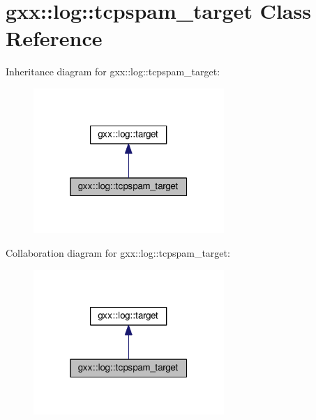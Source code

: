 \hypertarget{classgxx_1_1log_1_1tcpspam__target}{}\section{gxx\+:\+:log\+:\+:tcpspam\+\_\+target Class Reference}
\label{classgxx_1_1log_1_1tcpspam__target}


Inheritance diagram for gxx\+:\+:log\+:\+:tcpspam\+\_\+target\+:
\nopagebreak
\begin{figure}[H]
\begin{center}
\leavevmode
\includegraphics[width=205pt]{classgxx_1_1log_1_1tcpspam__target__inherit__graph}
\end{center}
\end{figure}


Collaboration diagram for gxx\+:\+:log\+:\+:tcpspam\+\_\+target\+:
\nopagebreak
\begin{figure}[H]
\begin{center}
\leavevmode
\includegraphics[width=205pt]{classgxx_1_1log_1_1tcpspam__target__coll__graph}
\end{center}
\end{figure}

